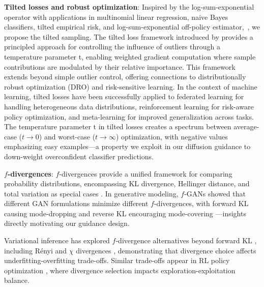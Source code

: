 \documentclass{article}
\begin{document}
\textbf{Tilted losses and robust optimization}: Inspired by the log-sum-exponential operator with applications in multinomial linear regression, naive Bayes classifiers, tilted empirical risk, and log-sum-exponential off-policy estimator,~\citep{calafiore2019log,murphy2012machine,williams1998bayesian,li2020tilted,behnamnialog}, we propose the tilted sampling. The tilted loss framework introduced by \cite{li2020tilted, li2023tiltedlossesmachinelearning} provides a principled approach for controlling the influence of outliers through a temperature parameter t, enabling weighted gradient computation where sample contributions are modulated by their relative importance. This framework extends beyond simple outlier control, offering connections to distributionally robust optimization (DRO) and risk-sensitive learning. In the context of machine learning, tilted losses have been successfully applied to federated learning for handling heterogeneous data distributions, reinforcement learning for risk-aware policy optimization, and meta-learning for improved generalization across tasks. The temperature parameter t in tilted losses creates a spectrum between average-case ($t \to 0$) and worst-case ($t \to \infty$) optimization, with negative values emphasizing easy examples—a property we exploit in our diffusion guidance to down-weight overconfident classifier predictions.




\textbf{$f$-divergences}: $f$-divergences \cite{csiszar1967information, ali1966general} provide a unified framework for comparing probability distributions, encompassing KL divergence, Hellinger distance, and total variation as special cases \cite{sason2016divergence}. In generative modeling, $f$-GANs \cite{nowozin2016f} showed that different GAN formulations minimize different $f$-divergences, with forward KL causing mode-dropping and reverse KL encouraging mode-covering \cite{arjovsky2017wasserstein}—insights directly motivating our guidance design.

Variational inference has explored $f$-divergence alternatives beyond forward KL \cite{jordan1999introduction}, including Rényi \cite{li2016renyi} and $\chi$ divergences \cite{dieng2017chi}, demonstrating that divergence choice affects underfitting-overfitting trade-offs. Similar trade-offs appear in RL policy optimization \cite{nachum2017trust, lee2021optidice}, where divergence selection impacts exploration-exploitation balance.
\end{document}
